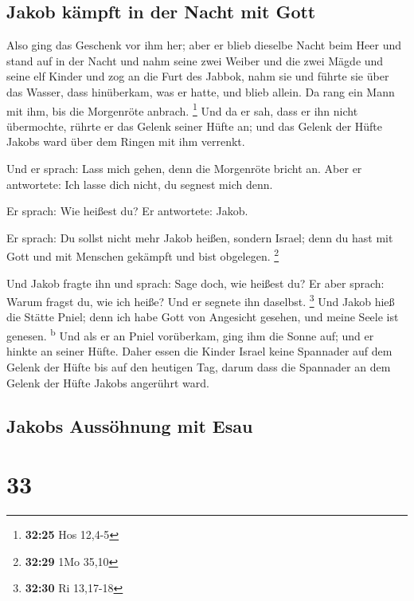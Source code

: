 \hypertarget{jakob-kuxe4mpft-in-der-nacht-mit-gott}{%
\subsection{Jakob kämpft in der Nacht mit
Gott}\label{jakob-kuxe4mpft-in-der-nacht-mit-gott}}

 Also ging das Geschenk vor ihm her; aber er blieb
dieselbe Nacht beim Heer  und stand auf in der Nacht und
nahm seine zwei Weiber und die zwei Mägde und seine elf Kinder und zog
an die Furt des Jabbok,  nahm sie und führte sie über das
Wasser, dass hinüberkam, was er hatte,  und blieb allein.
Da rang ein Mann mit ihm, bis die Morgenröte anbrach. \footnote{\textbf{32:25}
  Hos 12,4-5}  Und da er sah, dass er ihn nicht
übermochte, rührte er das Gelenk seiner Hüfte an; und das Gelenk der
Hüfte Jakobs ward über dem Ringen mit ihm verrenkt.

 Und er sprach: Lass mich gehen, denn die Morgenröte
bricht an. Aber er antwortete: Ich lasse dich nicht, du segnest mich
denn.

 Er sprach: Wie heißest du? Er antwortete: Jakob.

 Er sprach: Du sollst nicht mehr Jakob heißen, sondern
Israel; denn du hast mit Gott und mit Menschen gekämpft und bist
obgelegen. \footnote{\textbf{32:29} 1Mo 35,10}

 Und Jakob fragte ihn und sprach: Sage doch, wie heißest
du? Er aber sprach: Warum fragst du, wie ich heiße? Und er segnete ihn
daselbst. \footnote{\textbf{32:30} Ri 13,17-18}  Und
Jakob hieß die Stätte Pniel; denn ich habe Gott von Angesicht gesehen,
und meine Seele ist genesen. \textsuperscript{b}  Und als
er an Pniel vorüberkam, ging ihm die Sonne auf; und er hinkte an seiner
Hüfte.  Daher essen die Kinder Israel keine Spannader auf
dem Gelenk der Hüfte bis auf den heutigen Tag, darum dass die Spannader
an dem Gelenk der Hüfte Jakobs angerührt ward.

\hypertarget{jakobs-aussuxf6hnung-mit-esau}{%
\subsection{Jakobs Aussöhnung mit
Esau}\label{jakobs-aussuxf6hnung-mit-esau}}

\hypertarget{section-32}{%
\section{33}\label{section-32}}

